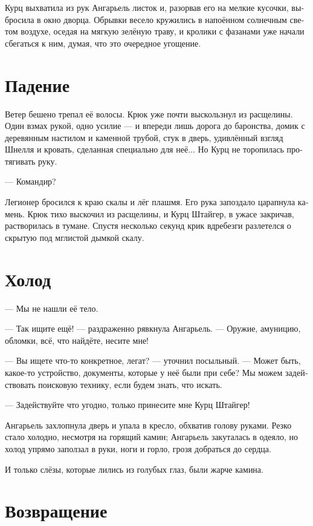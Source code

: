 \documentclass[a4paper,12pt,fleqn]{book}\usepackage{cooltooltips}\usepackage{polyglossia}\setdefaultlanguage[babelshorthands=true]{russian}\setotherlanguage{english}\defaultfontfeatures{Ligatures=TeX,Mapping=tex-text} \usepackage{xcolor}\definecolor{lightgray}{HTML}{bbbbbb}\color{lightgray}\newcommand{\ml}[3]{\textenglish{\textcolor{black}{#3}}}
\begin{document}
Курц выхватила из рук Ангарьель листок и, разорвав его на мелкие кусочки, выбросила в окно дворца.
Обрывки весело кружились в напоённом солнечным светом воздухе, оседая на мягкую зелёную траву, и кролики с фазанами уже начали сбегаться к ним, думая, что это очередное угощение.

\section{Падение}

Ветер бешено трепал её волосы.
Крюк уже почти выскользнул из расщелины.
Один взмах рукой, одно усилие --- и впереди лишь дорога до баронства, домик с деревянным настилом и каменной трубой, стук в дверь, удивлённый взгляд Шнелля и кровать, сделанная специально для неё...
Но Курц не торопилась протягивать руку.

--- Командир?

Легионер бросился к краю скалы и лёг плашмя.
Его рука запоздало царапнула камень.
Крюк тихо выскочил из расщелины, и Курц Штайгер, в ужасе закричав, растворилась в тумане.
Спустя несколько секунд крик вдребезги разлетелся о скрытую под мглистой дымкой скалу. 

\section{Холод}

--- Мы не нашли её тело.

--- Так ищите ещё! --- раздраженно рявкнула Ангарьель.
--- Оружие, амуницию, обломки, всё, что найдёте, несите мне!

--- Вы ищете что-то конкретное, легат? --- уточнил посыльный.
--- Может быть, какое-то устройство, документы, которые у неё были при себе?
Мы можем задействовать поисковую технику, если будем знать, что искать.

--- Задействуйте что угодно, только принесите мне Курц Штайгер!

Ангарьель захлопнула дверь и упала в кресло, обхватив голову руками.
Резко стало холодно, несмотря на горящий камин;
Ангарьель закуталась в одеяло, но холод упрямо заползал в руки, ноги и горло, грозя добраться до сердца.

И только слёзы, которые лились из голубых глаз, были жарче камина. 

\section{Возвращение}
\end{document}
